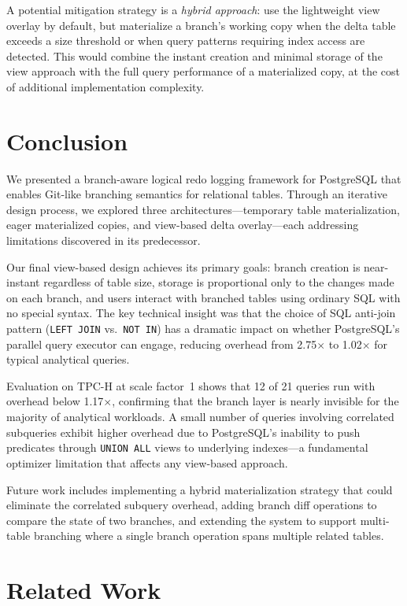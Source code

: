 \documentclass[sigplan, nonacm]{acmart}
\begin{document}
A potential mitigation strategy is a \emph{hybrid approach}: use the lightweight view overlay by default, but materialize a branch's working copy when the delta table exceeds a size threshold or when query patterns requiring index access are detected. This would combine the instant creation and minimal storage of the view approach with the full query performance of a materialized copy, at the cost of additional implementation complexity.

\section{Conclusion}

We presented a branch-aware logical redo logging framework for PostgreSQL that enables Git-like branching semantics for relational tables. Through an iterative design process, we explored three architectures---temporary table materialization, eager materialized copies, and view-based delta overlay---each addressing limitations discovered in its predecessor.

Our final view-based design achieves its primary goals: branch creation is near-instant regardless of table size, storage is proportional only to the changes made on each branch, and users interact with branched tables using ordinary SQL with no special syntax. The key technical insight was that the choice of SQL anti-join pattern (\texttt{LEFT~JOIN} vs.\ \texttt{NOT~IN}) has a dramatic impact on whether PostgreSQL's parallel query executor can engage, reducing overhead from 2.75$\times$ to 1.02$\times$ for typical analytical queries.

Evaluation on TPC-H at scale factor~1 shows that 12 of 21 queries run with overhead below 1.17$\times$, confirming that the branch layer is nearly invisible for the majority of analytical workloads. A small number of queries involving correlated subqueries exhibit higher overhead due to PostgreSQL's inability to push predicates through \texttt{UNION~ALL} views to underlying indexes---a fundamental optimizer limitation that affects any view-based approach.

Future work includes implementing a hybrid materialization strategy that could eliminate the correlated subquery overhead, adding branch diff operations to compare the state of two branches, and extending the system to support multi-table branching where a single branch operation spans multiple related tables.

\section{Related Work}
\end{document}
